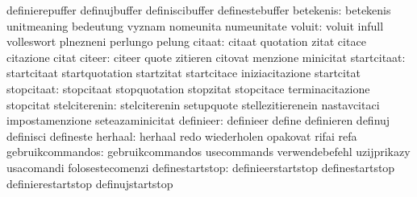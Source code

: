                                   definierepuffer                  definujbuffer
                                  definiscibuffer                  definestebuffer
                       betekenis: betekenis                        unitmeaning
                                  bedeutung                        vyznam
                                  nomeunita                        numeunitate %
                          voluit: voluit                           infull
                                  volleswort                       plnezneni
                                  perlungo                         pelung
                          citaat: citaat                           quotation
                                  zitat                            citace
                                  citazione                        citat
                          citeer: citeer                           quote
                                  zitieren                         citovat
                                  menzione                         minicitat
                     startcitaat: startcitaat                      startquotation
                                  startzitat                       startcitace
                                  iniziacitazione                  startcitat
                      stopcitaat: stopcitaat                       stopquotation
                                  stopzitat                        stopcitace
                                  terminacitazione                 stopcitat
                   stelciterenin: stelciterenin                    setupquote
                                  stellezitierenein                nastavcitaci
                                  impostamenzione                  seteazaminicitat
                       definieer: definieer                        define
                                  definieren                       definuj
                                  definisci                        defineste
                         herhaal: herhaal                          redo
                                  wiederholen                      opakovat
                                  rifai                            refa
                gebruikcommandos: gebruikcommandos                 usecommands
                                  verwendebefehl                   uzijprikazy
                                  usacomandi                       folosestecomenzi
                 definestartstop: definieerstartstop               definestartstop
                                  definierestartstop               definujstartstop
